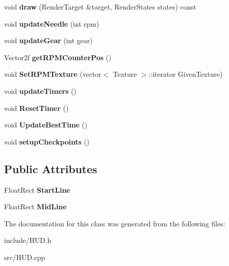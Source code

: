 \begin{DoxyCompactItemize}
\item 
\hypertarget{class_h_u_d_a16086edcd0d5d6e62bd4d911dd0145e5}{}void {\bfseries draw} (Render\+Target \&target, Render\+States states) const \label{class_h_u_d_a16086edcd0d5d6e62bd4d911dd0145e5}

\item 
\hypertarget{class_h_u_d_a96d4d120cedd21c3153d3c1fc45f5ef6}{}void {\bfseries update\+Needle} (int rpm)\label{class_h_u_d_a96d4d120cedd21c3153d3c1fc45f5ef6}

\item 
\hypertarget{class_h_u_d_a0dc3e03d60ae3626345d9dc7e8287ff5}{}void {\bfseries update\+Gear} (int gear)\label{class_h_u_d_a0dc3e03d60ae3626345d9dc7e8287ff5}

\item 
\hypertarget{class_h_u_d_adaa1781bccee569c107a667b095752de}{}Vector2f {\bfseries get\+R\+P\+M\+Counter\+Pos} ()\label{class_h_u_d_adaa1781bccee569c107a667b095752de}

\item 
\hypertarget{class_h_u_d_ab8ff106a8d659c4fc96ae8fae8771388}{}void {\bfseries Set\+R\+P\+M\+Texture} (vector$<$ Texture $>$\+::iterator Given\+Texture)\label{class_h_u_d_ab8ff106a8d659c4fc96ae8fae8771388}

\item 
\hypertarget{class_h_u_d_a18bacebe294e788fd5ed81df01231915}{}void {\bfseries update\+Timers} ()\label{class_h_u_d_a18bacebe294e788fd5ed81df01231915}

\item 
\hypertarget{class_h_u_d_afafdadaf2c5c10c0e86f9fa8663069f8}{}void {\bfseries Reset\+Timer} ()\label{class_h_u_d_afafdadaf2c5c10c0e86f9fa8663069f8}

\item 
\hypertarget{class_h_u_d_a9fdbf33bc666f4f352dbb648bd0eb157}{}void {\bfseries Update\+Best\+Time} ()\label{class_h_u_d_a9fdbf33bc666f4f352dbb648bd0eb157}

\item 
\hypertarget{class_h_u_d_abb00889ad68e7a11ff243016f729ac97}{}void {\bfseries setup\+Checkpoints} ()\label{class_h_u_d_abb00889ad68e7a11ff243016f729ac97}

\end{DoxyCompactItemize}
\subsection*{Public Attributes}
\begin{DoxyCompactItemize}
\item 
\hypertarget{class_h_u_d_a7bb7d2643771405999f4d303441b14cb}{}Float\+Rect {\bfseries Start\+Line}\label{class_h_u_d_a7bb7d2643771405999f4d303441b14cb}

\item 
\hypertarget{class_h_u_d_a5fe514e987ad2dfac4ba3bf44b77244c}{}Float\+Rect {\bfseries Mid\+Line}\label{class_h_u_d_a5fe514e987ad2dfac4ba3bf44b77244c}

\end{DoxyCompactItemize}


The documentation for this class was generated from the following files\+:\begin{DoxyCompactItemize}
\item 
include/H\+U\+D.\+h\item 
src/H\+U\+D.\+cpp\end{DoxyCompactItemize}
